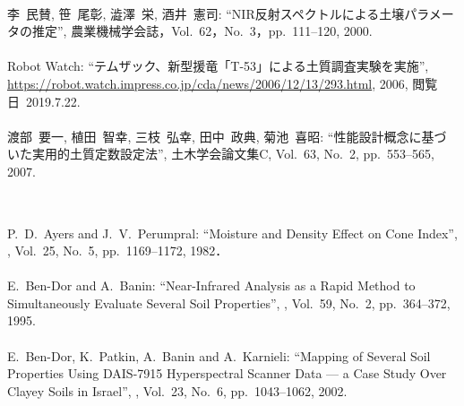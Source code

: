 \begin{mythebibliography}{}
\leavevmode \\李~民賛, 笹~尾彰, 澁澤~栄, 酒井~憲司:
\newblock ``NIR反射スペクトルによる土壌パラメータの推定'',
\newblock 農業機械学会誌，Vol.~62，No.~3，pp.~111--120, 2000.
\\

\leavevmode \\Robot Watch:
\newblock ``テムザック、新型援竜「T-53」による土質調査実験を実施'', \\
\newblock \url{https://robot.watch.impress.co.jp/cda/news/2006/12/13/293.html}, 2006, 
\newblock \mbox{閲覧日 2019.7.22}.
\\

\leavevmode \\渡部~要一, 植田~智幸, 三枝~弘幸, 田中~政典, 菊池~喜昭:
\newblock ``性能設計概念に基づいた実用的土質定数設定法'',
\newblock 土木学会論文集C, Vol.~63, No.~2, pp.~553--565, 2007.
\\

\newpage


\subsection*{}

\leavevmode \\P.~D.~Ayers and J.~V.~Perumpral:
\newblock ``Moisture and Density Effect on Cone Index'',
, Vol.~25, No.~5, pp.~1169--1172, 1982．
\\

\leavevmode \\E.~Ben-Dor and A.~Banin:
\newblock ``Near-Infrared Analysis as a Rapid Method to Simultaneously Evaluate Several Soil Properties'',
, Vol.~59, No.~2, pp.~364--372, 1995.
\\  

\leavevmode \\E.~Ben-Dor, K.~Patkin, A.~Banin and A.~Karnieli:
\newblock ``Mapping of Several Soil Properties Using DAIS-7915 Hyperspectral Scanner Data — a Case Study Over Clayey Soils in Israel'',
, Vol.~23, No.~6, pp.~1043--1062, 2002.
\\


\end{mythebibliography}
